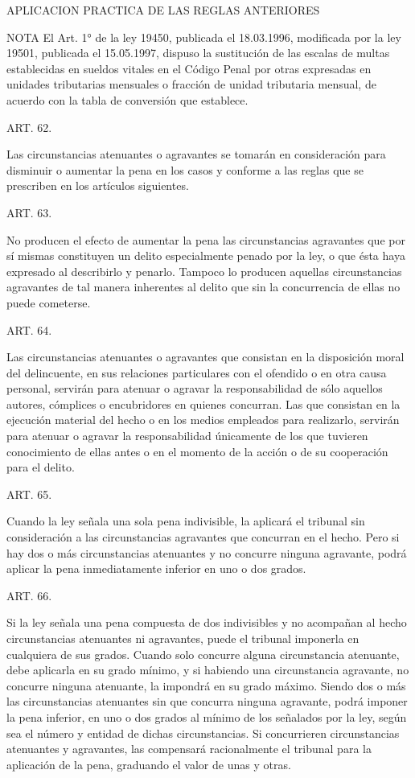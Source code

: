     APLICACION PRACTICA DE LAS REGLAS ANTERIORES 




NOTA
      El Art. 1° de la ley 19450, publicada el 18.03.1996, modificada por la ley 19501, publicada el 15.05.1997, dispuso la sustitución de las escalas de multas establecidas en sueldos vitales en el Código Penal por otras expresadas en unidades tributarias mensuales o fracción de unidad tributaria mensual, de acuerdo con la tabla de conversión que establece.

    ART. 62.

    Las circunstancias atenuantes o agravantes se tomarán en consideración para disminuir o aumentar la pena en los casos y conforme a las reglas que se prescriben en los artículos siguientes.



    ART. 63.

    No producen el efecto de aumentar la pena las circunstancias agravantes que por sí mismas constituyen un delito especialmente penado por la ley, o que ésta haya expresado al describirlo y penarlo.
    Tampoco lo producen aquellas circunstancias agravantes de tal manera inherentes al delito que sin la concurrencia de ellas no puede cometerse.


    ART. 64.

    Las circunstancias atenuantes o agravantes que consistan en la disposición moral del delincuente, en sus relaciones particulares con el ofendido o en otra causa personal, servirán para atenuar o agravar la responsabilidad de sólo aquellos autores, cómplices o encubridores en quienes concurran.
    Las que consistan en la ejecución material del hecho o en los medios empleados para realizarlo, servirán para atenuar o agravar la responsabilidad únicamente de los que tuvieren conocimiento de ellas antes o en el momento de la acción o de su cooperación para el delito.




    ART. 65.

    Cuando la ley señala una sola pena indivisible, la aplicará el tribunal sin consideración a las circunstancias agravantes que concurran en el hecho. Pero si hay dos o más circunstancias atenuantes y no concurre ninguna agravante, podrá aplicar la pena inmediatamente inferior en uno o dos grados.




    ART. 66.

    Si la ley señala una pena compuesta de dos indivisibles y no acompañan al hecho circunstancias atenuantes ni agravantes, puede el tribunal imponerla en cualquiera de sus grados.
    Cuando solo concurre alguna circunstancia atenuante, debe aplicarla en su grado mínimo, y si habiendo una circunstancia agravante, no concurre ninguna atenuante, la impondrá en su grado máximo.
    Siendo dos o más las circunstancias atenuantes sin que concurra ninguna agravante, podrá imponer la pena inferior, en uno o dos grados al mínimo de los señalados por la ley, según sea el número y entidad de dichas circunstancias.
    Si concurrieren circunstancias atenuantes y agravantes, las compensará racionalmente el tribunal para la aplicación de la pena, graduando el valor de unas y otras.



